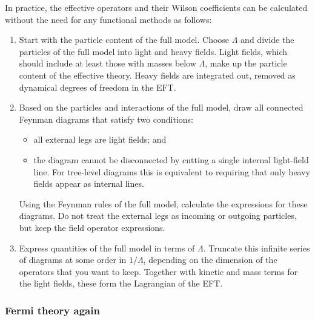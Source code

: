 In practice, the effective operators and their Wilson coefficients can
be calculated without the need for any functional methods as follows:
%
\begin{enumerate}
\item Start with the particle content of the full model. Choose
  $\Lambda$ and divide the particles of the full model into light and
  heavy fields. Light fields, which should include at least those with
  masses below $\Lambda$, make up the particle content of the
  effective theory. Heavy fields are integrated out, \ie removed as
  dynamical degrees of freedom in the EFT.
%
\item Based on the particles and interactions of the full model, draw
  all connected Feynman diagrams that satisfy two conditions:
%
  \begin{itemize}
    \item all external legs are light fields; and
    \item the diagram cannot be disconnected by cutting a single
      internal light-field line. For tree-level diagrams this is
      equivalent to requiring that only heavy fields appear as
      internal lines.
  \end{itemize}
%
  Using the Feynman rules of the full model, calculate the expressions
  for these diagrams. Do not treat the external legs as incoming or
  outgoing particles, but keep the field operator expressions.
%
\item Express quantities of the full model in terms of
  $\Lambda$. Truncate this infinite series of diagrams at some order
  in $1/\Lambda$, depending on the dimension of the operators that you
  want to keep. Together with kinetic and mass terms for the light
  fields, these form the Lagrangian of the EFT.
\end{enumerate}



  
\subsubsection{Fermi theory again}

